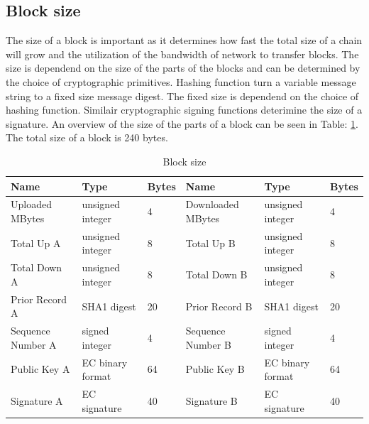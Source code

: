 \subsection{Block size}
The size of a block is important as it determines how fast the total size of a chain will grow
and the utilization of the bandwidth of network to transfer blocks.
The size is dependend on the size of the parts of the blocks
and can be determined by the choice of cryptographic primitives.
Hashing function turn a variable message string to a fixed size message digest\cite{VanderLubbe-crypto}.
The fixed size is dependend on the choice of hashing function.
Similair cryptographic signing functions deterimine the size of a signature.
An overview of the size of the parts of a block can be seen in Table: \ref{table:block_size}.
The total size of a block is 240 bytes.

\begin{table}[]
\begin{adjustwidth}{-.5in}{-.5in}
\begin{center}
\begin{tabular}{lll||lll}
Name              & Type             & Bytes                   & Name              & Type             & Bytes \\ \hline
Uploaded MBytes   & unsigned integer & 4                       & Downloaded MBytes & unsigned integer & 4     \\
Total Up A        & unsigned integer & 8                       & Total Up B        & unsigned integer & 8     \\
Total Down A      & unsigned integer & 8                       & Total Down B      & unsigned integer & 8     \\
Prior Record A    & SHA1 digest      & 20                      & Prior Record B    & SHA1 digest      & 20    \\
Sequence Number A & signed integer   & 4                       & Sequence Number B & signed integer   & 4     \\
Public Key A      & EC binary format & 64                      & Public Key B      & EC binary format & 64    \\
Signature A       & EC signature     & 40                      & Signature B       & EC signature     & 40
\end{tabular}
\caption{Block size}
\label{table:block_size}
\end{center}
\end{adjustwidth}
\end{table}